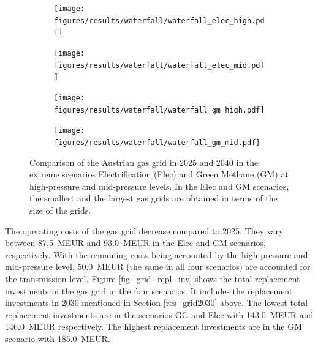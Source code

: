 \begin{figure}[h]
	\begin{subfigure}[c]{0.5\textwidth}
		\centering
		\texttt{[image: figures/results/waterfall/waterfall\_elec\_high.pdf]}
		\vspace{-0.6cm}
		\label{Fig:a}
	\end{subfigure}
	\begin{subfigure}[c]{0.5\textwidth}
		\centering
		\texttt{[image: figures/results/waterfall/waterfall\_elec\_mid.pdf]}
		\vspace{-0.6cm}
		\label{Fig:b}
	\end{subfigure}
	\newline
	\newline
	\newline
	\begin{subfigure}[c]{0.5\textwidth}
		\centering
		\texttt{[image: figures/results/waterfall/waterfall\_gm\_high.pdf]}
		\vspace{-0.6cm}
		\label{Fig:c}
	\end{subfigure}
	\begin{subfigure}[c]{0.5\textwidth}
		\centering
		\texttt{[image: figures/results/waterfall/waterfall\_gm\_mid.pdf]}
		\vspace{-0.6cm}
		\label{Fig:d}
	\end{subfigure}
	\caption{Comparison of the Austrian gas grid in 2025 and 2040 in the extreme scenarios Electrification (Elec) and Green Methane (GM) at high-pressure and mid-pressure levels. In the Elec and GM scenarios, the smallest and the largest gas grids are obtained in terms of the size of the grids.}
	\label{fig_reduction_waterfall}
\end{figure}

The operating costs of the gas grid decrease compared to 2025. They vary between \SI{87.5}{MEUR} and \SI{93.0}{MEUR} in the Elec and GM scenarios, respectively. With the remaining costs being accounted by the high-pressure and mid-pressure level, \SI{50.0}{MEUR} (the same in all four scenarios) are accounted for the transmission level. Figure \ref{fig_grid_repl_inv} shows the total replacement investments in the gas grid in the four scenarios. It includes the replacement investments in 2030 mentioned in Section \ref{res_grid2030} above. The lowest total replacement investments are in the scenarios GG and Elec with \SI{143.0}{MEUR} and \SI{146.0}{MEUR} respectively. The highest replacement investments are in the GM scenario with \SI{185.0}{MEUR}. 

